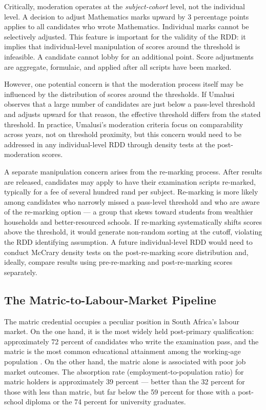 \documentclass[12pt]{article}
\begin{document}
Critically, moderation operates at the \emph{subject-cohort} level, not the individual level. A decision to adjust Mathematics marks upward by 3 percentage points applies to all candidates who wrote Mathematics. Individual marks cannot be selectively adjusted. This feature is important for the validity of the RDD: it implies that individual-level manipulation of scores around the threshold is infeasible. A candidate cannot lobby for an additional point. Score adjustments are aggregate, formulaic, and applied after all scripts have been marked.

However, one potential concern is that the moderation process itself may be influenced by the distribution of scores around the thresholds. If Umalusi observes that a large number of candidates are just below a pass-level threshold and adjusts upward for that reason, the effective threshold differs from the stated threshold. In practice, Umalusi's moderation criteria focus on comparability across years, not on threshold proximity, but this concern would need to be addressed in any individual-level RDD through density tests at the post-moderation scores.

A separate manipulation concern arises from the re-marking process. After results are released, candidates may apply to have their examination scripts re-marked, typically for a fee of several hundred rand per subject. Re-marking is more likely among candidates who narrowly missed a pass-level threshold and who are aware of the re-marking option --- a group that skews toward students from wealthier households and better-resourced schools. If re-marking systematically shifts scores above the threshold, it would generate non-random sorting at the cutoff, violating the RDD identifying assumption. A future individual-level RDD would need to conduct McCrary density tests \citep{mccrary2008manipulation} on the post-re-marking score distribution and, ideally, compare results using pre-re-marking and post-re-marking scores separately.

\subsection{The Matric-to-Labour-Market Pipeline}

The matric credential occupies a peculiar position in South Africa's labour market. On the one hand, it is the most widely held post-primary qualification: approximately 72 percent of candidates who write the examination pass, and the matric is the most common educational attainment among the working-age population \citep{statssa2019qlfs}. On the other hand, the matric alone is associated with poor job market outcomes. The absorption rate (employment-to-population ratio) for matric holders is approximately 39 percent --- better than the 32 percent for those with less than matric, but far below the 59 percent for those with a post-school diploma or the 74 percent for university graduates.
\end{document}
